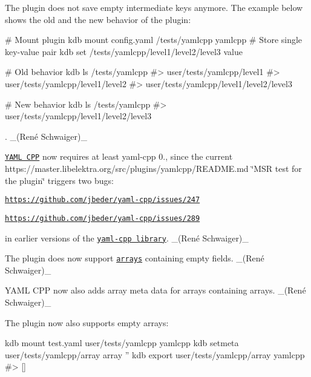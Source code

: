 \begin{DoxyItemize}
\item The plugin does not save empty intermediate keys anymore. The example below shows the old and the new behavior of the plugin\+:
\end{DoxyItemize}


\begin{DoxyCode}
# Mount plugin
kdb mount config.yaml /tests/yamlcpp yamlcpp
# Store single key-value pair
kdb set /tests/yamlcpp/level1/level2/level3 value

# Old behavior
kdb ls /tests/yamlcpp
#> user/tests/yamlcpp/level1
#> user/tests/yamlcpp/level1/level2
#> user/tests/yamlcpp/level1/level2/level3

# New behavior
kdb ls /tests/yamlcpp
#> user/tests/yamlcpp/level1/level2/level3
\end{DoxyCode}


. \+\_\+(René Schwaiger)\+\_\+


\begin{DoxyItemize}
\item \href{http://libelektra.org/plugins/yamlcpp}{\tt Y\+A\+ML C\+PP} now requires at least {\ttfamily yaml-\/cpp 0.}, since the current https\+://master.libelektra.\+org/src/plugins/yamlcpp/\+R\+E\+A\+D\+ME.md \char`\"{}\+M\+S\+R test for the plugin\char`\"{} triggers two bugs\+:
\begin{DoxyItemize}
\item \href{https://github.com/jbeder/yaml-cpp/issues/247}{\tt https\+://github.\+com/jbeder/yaml-\/cpp/issues/247}
\item \href{https://github.com/jbeder/yaml-cpp/issues/289}{\tt https\+://github.\+com/jbeder/yaml-\/cpp/issues/289}
\end{DoxyItemize}

in earlier versions of the \href{https://github.com/jbeder/yaml-cpp}{\tt yaml-\/cpp library}. \+\_\+(René Schwaiger)\+\_\+
\item The plugin does now support \href{https://www.libelektra.org/tutorials/arrays}{\tt arrays} containing empty fields. \+\_\+(René Schwaiger)\+\_\+
\item Y\+A\+ML C\+PP now also adds {\ttfamily array} meta data for arrays containing arrays. \+\_\+(René Schwaiger)\+\_\+
\item The plugin now also supports empty arrays\+:
\end{DoxyItemize}


\begin{DoxyCode}
kdb mount test.yaml user/tests/yamlcpp yamlcpp
kdb setmeta user/tests/yamlcpp/array array ''
kdb export user/tests/yamlcpp/array yamlcpp
#> []
\end{DoxyCode}



